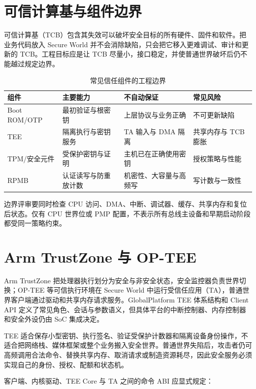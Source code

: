 \section{可信计算基与组件边界}

可信计算基（TCB）包含其失效可以破坏安全目标的所有硬件、固件和软件。把业务代码放入 Secure World 并不会消除缺陷，只会把它移入更难调试、审计和更新的 TCB。工程目标应是让 TCB 尽量小，接口稳定，并使普通世界破坏后仍不能越过规定边界。

\begin{table}[H]
  \centering
  \caption{常见信任组件的工程边界}
  \begin{tabular}{p{30mm}p{38mm}p{38mm}p{30mm}}
    \hline
    组件 & 主要能力 & 不自动保证 & 常见风险 \\
    \hline
    Boot ROM/OTP & 最初验证与根密钥 & 上层协议与业务正确 & 不可更新缺陷 \\
    TEE & 隔离执行与密钥服务 & TA 输入与 DMA 隔离 & 共享内存与 TCB 膨胀 \\
    TPM/安全元件 & 受保护密钥与证明 & 主机已在正确使用密钥 & 授权策略与性能 \\
    RPMB & 认证读写与防重放计数 & 机密性、大容量与高频写 & 写计数与一致性 \\
    \hline
  \end{tabular}
\end{table}

边界评审要同时检查 CPU 访问、DMA、中断、调试器、缓存、共享内存和复位后状态。仅有 CPU 世界位或 PMP 配置，不表示所有总线主设备和早期启动阶段都受同一策略约束。

\section{Arm TrustZone 与 OP-TEE}

Arm TrustZone 把处理器执行划分为安全与非安全状态，安全监控器负责世界切换；OP-TEE 等可信执行环境在 Secure World 中运行受信任应用（TA），普通世界客户端通过驱动和共享内存请求服务\cite{optee-doc}。GlobalPlatform TEE 体系结构和 Client API 定义了常见角色、会话与参数语义，但具体平台的中断控制器、内存控制器和安全外设仍由 SoC 集成决定\cite{globalplatform-tee-system-architecture,globalplatform-tee-client-api}。

TEE 适合保存小型密钥、执行签名、验证受保护计数器和隔离设备身份操作，不适合把网络栈、媒体框架或整个业务搬入安全世界。普通世界失陷后，攻击者仍可高频调用合法命令、替换共享内存、取消请求或制造资源耗尽，因此安全服务必须实现自己的身份、授权、配额和状态机。

客户端、内核驱动、TEE Core 与 TA 之间的命令 ABI 应显式规定：

